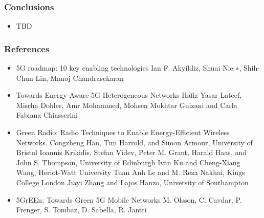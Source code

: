 \documentclass[a4paper,11pt,handout]{beamer}
\begin{document}
\begin{frame}
\frametitle{Conclusions}

\begin{itemize}
	\item TBD
\end{itemize}
\end{frame}
\note{
}
\begin{frame}
\frametitle{References}
\begin{itemize}
	\item 5G roadmap: 10 key enabling technologies Ian F. Akyildiz, Shuai Nie ∗, Shih-Chun Lin, Manoj Chandrasekaran
\item Towards Energy-Aware 5G Heterogeneous Networks Hafiz Yasar Lateef, Mischa Dohler, Amr Mohammed, Mohsen Mokhtar Guizani and Carla Fabiana Chiasserini
\item Green Radio: Radio Techniques to Enable Energy-Efficient Wireless Networks. Congzheng Han, Tim Harrold, and Simon Armour, University of Bristol Ioannis Krikidis, Stefan Videv, Peter M. Grant, Harald Haas, and John S. Thompson, University of Edinburgh Ivan Ku and Cheng-Xiang Wang, Heriot-Watt University Tuan Anh Le and M. Reza Nakhai, Kings College London Jiayi Zhang and Lajos Hanzo, University of Southampton
\item 5GrEEn: Towards Green 5G Mobile Networks M. Olsson, C. Cavdar, P. Frenger, S. Tombaz, D. Sabella, R. Jantti
\end{itemize}
\end{frame}
\note{
}
\end{document}
